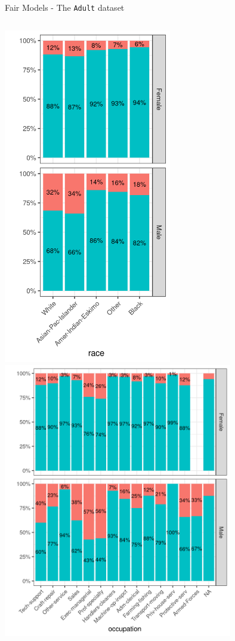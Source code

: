 \documentclass[11pt,compress,t,notes=noshow,xcolor=table]{beamer}
\begin{document}
\begin{vbframe}{Fair Models - The \texttt{Adult} dataset}
\begin{columns}
\begin{column}{0.5\textwidth}
\includegraphics[width=0.55\textwidth]{slides/11-multicrit/figure_man/dataset_adult_race.png}%
\includegraphics[width=0.75\textwidth]{slides/11-multicrit/figure_man/dataset_adult_education.png}
\end{column}
\end{columns}

\end{vbframe}
\end{document}
